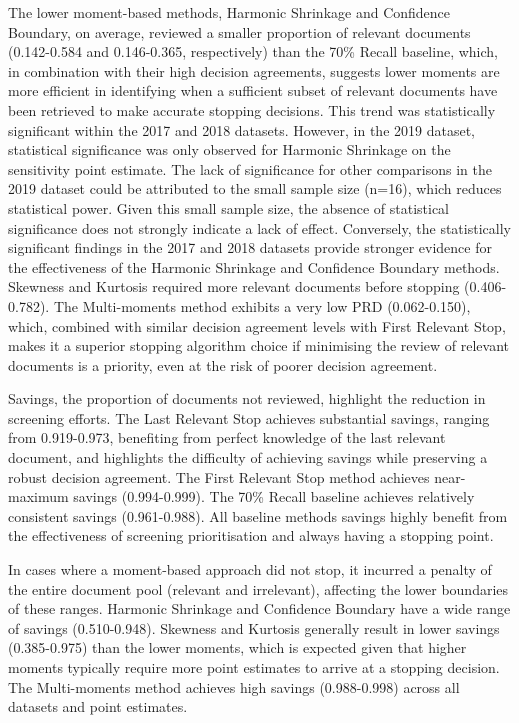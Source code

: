 \documentclass[sigconf,natbib=true,anonymous=true]{acmart}
\begin{document}
The lower moment-based methods, Harmonic Shrinkage and Confidence Boundary, on average, reviewed a smaller proportion of relevant documents (0.142-0.584 and 0.146-0.365, respectively) than the 70\% Recall baseline, which, in combination with their high decision agreements, suggests lower moments are more efficient in identifying when a sufficient subset of relevant documents have been retrieved to make accurate stopping decisions. This trend was statistically significant within the 2017 and 2018 datasets. However, in the 2019 dataset, statistical significance was only observed for Harmonic Shrinkage on the sensitivity point estimate. The lack of significance for other comparisons in the 2019 dataset could be attributed to the small sample size (n=16), which reduces statistical power. Given this small sample size, the absence of statistical significance does not strongly indicate a lack of effect. Conversely, the statistically significant findings in the 2017 and 2018 datasets provide stronger evidence for the effectiveness of the Harmonic Shrinkage and Confidence Boundary methods. Skewness and Kurtosis required more relevant documents before stopping (0.406-0.782). The Multi-moments method exhibits a very low PRD (0.062-0.150), which, combined with similar decision agreement levels with First Relevant Stop, makes it a superior stopping algorithm choice if minimising the review of relevant documents is a priority, even at the risk of poorer decision agreement.

Savings, the proportion of documents not reviewed, highlight the reduction in screening efforts. The Last Relevant Stop achieves substantial savings, ranging from 0.919-0.973, benefiting from perfect knowledge of the last relevant document, and highlights the difficulty of achieving savings while preserving a robust decision agreement. The First Relevant Stop method achieves near-maximum savings (0.994-0.999). The 70\% Recall baseline achieves relatively consistent savings (0.961-0.988). All baseline methods savings highly benefit from the effectiveness of screening prioritisation and always having a stopping point.


In cases where a moment-based approach did not stop, it incurred a penalty of the entire document pool (relevant and irrelevant), affecting the lower boundaries of these ranges. Harmonic Shrinkage and Confidence Boundary have a wide range of savings (0.510-0.948). Skewness and Kurtosis generally result in lower savings (0.385-0.975) than the lower moments, which is expected given that higher moments typically require more point estimates to arrive at a stopping decision. The Multi-moments method achieves high savings (0.988-0.998) across all datasets and point estimates.
\end{document}
